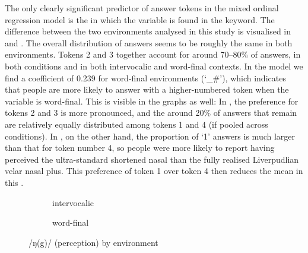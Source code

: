 The only clearly significant predictor of answer tokens in the mixed ordinal regression model is the  in which the variable is found in the keyword.
The difference between the two environments analysed in this study is visualised in  and .
The overall distribution of answers seems to be roughly the same in both environments.
Tokens 2 and 3 together account for around 70--80\% of answers, in both  conditions and in both intervocalic and word-final contexts.
In the model we find a coefficient of 0.239 for word-final environments (`\_\#'), which indicates that people are more likely to answer with a higher-numbered token when the variable is word-final.
This is visible in the graphs as well: In , the preference for tokens 2 and 3 is more pronounced, and the around 20\% of answers that remain are relatively equally distributed among tokens 1 and 4 (if pooled across  conditions).
In , on the other hand, the proportion of `1' answers is much larger than that for token number 4, so people were more likely to report having perceived the ultra-standard shortened nasal than the fully realised Liverpudlian velar nasal plus.
This preference of token 1 over token 4 then reduces the mean in this .

\begin{figure}
	
	\begin{subfigure}{0.49\textwidth}
		
			\resizebox{\linewidth}{!}{}
		\caption{intervocalic}
		\label{fig.bar.ng.ext.intervoc}
	\end{subfigure}
	\begin{subfigure}{0.49\textwidth}
		
			\resizebox{\linewidth}{!}{} 
		\caption{word-final}
		\label{fig.bar.ng.ext.wordfinal}
	\end{subfigure}
	\caption{/ŋ(g)/ (perception) by environment}
	\label{fig.bar.ng.ext.environment}
\end{figure}

